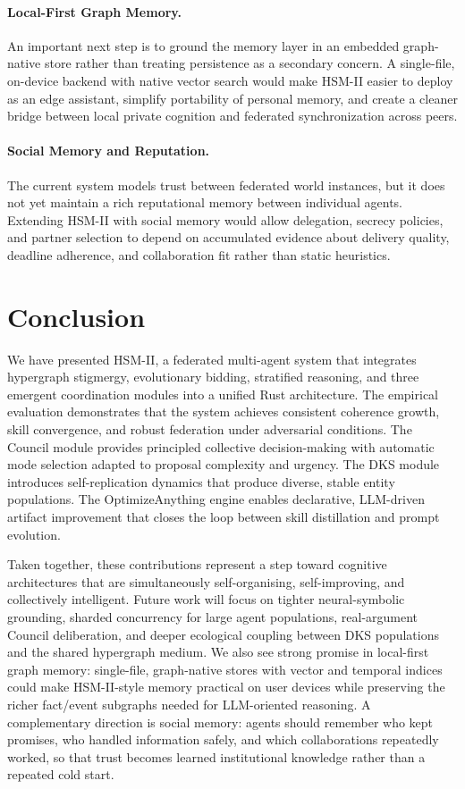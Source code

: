 \documentclass[11pt]{article}
\begin{document}
\paragraph{Local-First Graph Memory.}
An important next step is to ground the memory layer in an embedded graph-native
store rather than treating persistence as a secondary concern. A single-file,
on-device backend with native vector search would make HSM-II easier to deploy as
an edge assistant, simplify portability of personal memory, and create a cleaner
bridge between local private cognition and federated synchronization across peers.

\paragraph{Social Memory and Reputation.}
The current system models trust between federated world instances, but it does
not yet maintain a rich reputational memory between individual agents. Extending
HSM-II with social memory would allow delegation, secrecy policies, and partner
selection to depend on accumulated evidence about delivery quality, deadline
adherence, and collaboration fit rather than static heuristics.

\section{Conclusion}
\label{sec:conclusion}

We have presented HSM-II, a federated multi-agent system that integrates hypergraph
stigmergy, evolutionary bidding, stratified reasoning, and three emergent
coordination modules into a unified Rust architecture. The empirical evaluation
demonstrates that the system achieves consistent coherence growth, skill
convergence, and robust federation under adversarial conditions. The Council module
provides principled collective decision-making with automatic mode selection
adapted to proposal complexity and urgency. The DKS module introduces
self-replication dynamics that produce diverse, stable entity populations.
The OptimizeAnything engine enables declarative, LLM-driven artifact improvement
that closes the loop between skill distillation and prompt evolution.

Taken together, these contributions represent a step toward cognitive architectures
that are simultaneously self-organising, self-improving, and collectively
intelligent. Future work will focus on tighter neural-symbolic grounding, sharded
concurrency for large agent populations, real-argument Council deliberation, and
deeper ecological coupling between DKS populations and the shared hypergraph
medium. We also see strong promise in local-first graph memory: single-file,
graph-native stores with vector and temporal indices could make HSM-II-style
memory practical on user devices while preserving the richer fact/event
subgraphs needed for LLM-oriented reasoning. A complementary direction is social
memory: agents should remember who kept promises, who handled information safely,
and which collaborations repeatedly worked, so that trust becomes learned
institutional knowledge rather than a repeated cold start.
\end{document}
